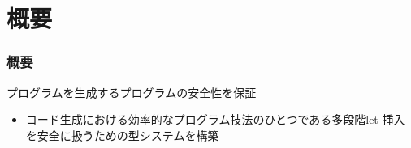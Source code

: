 \section{概要}

\begin{frame}
  \frametitle{概要}
  プログラムを生成するプログラムの安全性を保証
  \begin{itemize}
  \item<1-> [⇒] コード生成における効率的なプログラム技法のひとつである\alert{多段階let 挿入}を安全に扱うための型システムを構築
  \end{itemize}
\end{frame}

